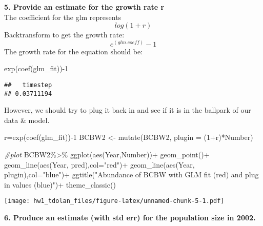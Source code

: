 \documentclass[
]{article}
\newenvironment{Shaded}{\begin{snugshade}}{\end{snugshade}}
\newcommand{\AttributeTok}[1]{\textcolor[rgb]{0.77,0.63,0.00}{#1}}
\newcommand{\CommentTok}[1]{\textcolor[rgb]{0.56,0.35,0.01}{\textit{#1}}}
\newcommand{\DecValTok}[1]{\textcolor[rgb]{0.00,0.00,0.81}{#1}}
\newcommand{\FunctionTok}[1]{\textcolor[rgb]{0.00,0.00,0.00}{#1}}
\newcommand{\NormalTok}[1]{#1}
\newcommand{\OtherTok}[1]{\textcolor[rgb]{0.56,0.35,0.01}{#1}}
\newcommand{\SpecialCharTok}[1]{\textcolor[rgb]{0.00,0.00,0.00}{#1}}
\newcommand{\StringTok}[1]{\textcolor[rgb]{0.31,0.60,0.02}{#1}}
\begin{document}
\textbf{5. Provide an estimate for the growth rate r}\\
The coefficient for the glm represents \[
log(1+r)
\] Backtransform to get the growth rate:\\
\[
e^{(glm.coeff)}-1
\] The growth rate for the equation should be:

\begin{Shaded}
\begin{Highlighting}[]
\FunctionTok{exp}\NormalTok{(}\FunctionTok{coef}\NormalTok{(glm\_fit))}\SpecialCharTok{{-}}\DecValTok{1}
\end{Highlighting}
\end{Shaded}

\begin{verbatim}
##   timestep 
## 0.03711194
\end{verbatim}

However, we should try to plug it back in and see if it is in the
ballpark of our data \& model.

\begin{Shaded}
\begin{Highlighting}[]
\NormalTok{r}\OtherTok{=}\FunctionTok{exp}\NormalTok{(}\FunctionTok{coef}\NormalTok{(glm\_fit))}\SpecialCharTok{{-}}\DecValTok{1}
\NormalTok{BCBW2 }\OtherTok{\textless{}{-}} \FunctionTok{mutate}\NormalTok{(BCBW2, }\AttributeTok{plugin =}\NormalTok{ (}\DecValTok{1}\SpecialCharTok{+}\NormalTok{r)}\SpecialCharTok{*}\NormalTok{Number)}

\CommentTok{\#plot}
\NormalTok{BCBW2}\SpecialCharTok{\%\textgreater{}\%}
  \FunctionTok{ggplot}\NormalTok{(}\FunctionTok{aes}\NormalTok{(Year,Number))}\SpecialCharTok{+}
  \FunctionTok{geom\_point}\NormalTok{()}\SpecialCharTok{+}
  \FunctionTok{geom\_line}\NormalTok{(}\FunctionTok{aes}\NormalTok{(Year, pred),}\AttributeTok{col=}\StringTok{"red"}\NormalTok{)}\SpecialCharTok{+}
  \FunctionTok{geom\_line}\NormalTok{(}\FunctionTok{aes}\NormalTok{(Year, plugin),}\AttributeTok{col=}\StringTok{"blue"}\NormalTok{)}\SpecialCharTok{+}
  \FunctionTok{ggtitle}\NormalTok{(}\StringTok{"Abundance of BCBW with GLM fit (red) and plug in values (blue)"}\NormalTok{)}\SpecialCharTok{+}
  \FunctionTok{theme\_classic}\NormalTok{()}
\end{Highlighting}
\end{Shaded}

\texttt{[image: hw1\_tdolan\_files/figure-latex/unnamed-chunk-5-1.pdf]}

\textbf{6. Produce an estimate (with std err) for the population size in
2002.}
\end{document}
